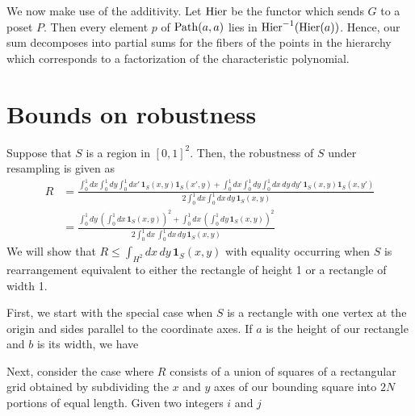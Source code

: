 We now make use of the additivity.  Let $\mathrm{Hier}$ be the functor which
sends $G$ to a poset $P$.  Then every element $p$ of $\mathrm{Path}(a,a)$ lies
in $\mathrm{Hier}^{-1} (\mathrm{Hier}(a))$.  Hence, our sum decomposes into partial sums
for the fibers of the points in the hierarchy which corresponds to a
factorization of the characteristic polynomial.

\section{Bounds on robustness}

Suppose that $S$ is a region in $[0,1]^2$.  Then, the robustness of $S$ under resampling is given as
\begin{align*}
R &= \frac{\int_0^1 dx \int_0^1 dy \int_0^1 dx'\, \mathbf{1}_{S} (x,y) \mathbf{1}_{S} (x',y) +
           \int_0^1 dx \int_0^1 dy \int_0^1 dx\,dy\,dy'\, \mathbf{1}_{S} (x,y) \mathbf{1}_{S} (x,y')}
          {2 \int_0^1 dx \int_0^1 dx\,dy\, \mathbf{1}_{S} (x,y)} \\
  &= \frac{\int_0^1 dy\, (\int_0^1 dx\, \mathbf{1}_{S} (x,y))^2 +
           \int_0^1 dx\, (\int_0^1 dy\, \mathbf{1}_{S} (x,y))^2}
          {2 \int_0^1 dx\, \int_0^1 dx\,dy\, \mathbf{1}_{S} (x,y)}
\end{align*}
We will show that $R \le \int_{H^2} dx\,dy\, \mathbf{1}_{S} (x,y)$ with equality occurring when $S$ is rearrangement equivalent to either the rectangle of height 1 or a rectangle of width 1.

First, we start with the special case when $S$ is a rectangle with one vertex at the origin and sides parallel to the coordinate axes.  If $a$ is the height of our rectangle and $b$ is its width, we have

Next, consider the case where $R$ consists of a union of squares of a rectangular grid obtained by subdividing the $x$ and $y$ axes of our bounding square into $2N$ portions of equal length.  Given two integers $i$ and $j$

